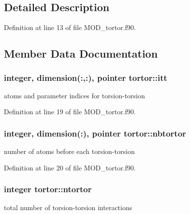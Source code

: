 \subsection{Detailed Description}


Definition at line 13 of file M\-O\-D\-\_\-tortor.\-f90.



\subsection{Member Data Documentation}
\hypertarget{classtortor_a3f439adf1817c9ea03ef242135e7a87b}{
\subsubsection[{itt}]{\setlength{\rightskip}{0pt plus 5cm}integer, dimension(\-:,\-:), pointer tortor\-::itt}}\label{classtortor_a3f439adf1817c9ea03ef242135e7a87b}


atoms and parameter indices for torsion-\/torsion 



Definition at line 19 of file M\-O\-D\-\_\-tortor.\-f90.

\hypertarget{classtortor_a900d77f3179edf2e0b16ea0b23d2eddd}{
\subsubsection[{nbtortor}]{\setlength{\rightskip}{0pt plus 5cm}integer, dimension(\-:), pointer tortor\-::nbtortor}}\label{classtortor_a900d77f3179edf2e0b16ea0b23d2eddd}


number of atoms before each torsion-\/torsion 



Definition at line 20 of file M\-O\-D\-\_\-tortor.\-f90.

\hypertarget{classtortor_a0fde598770f6f4cd056b5577bfc17ffc}{
\subsubsection[{ntortor}]{\setlength{\rightskip}{0pt plus 5cm}integer tortor\-::ntortor}}\label{classtortor_a0fde598770f6f4cd056b5577bfc17ffc}


total number of torsion-\/torsion interactions 



